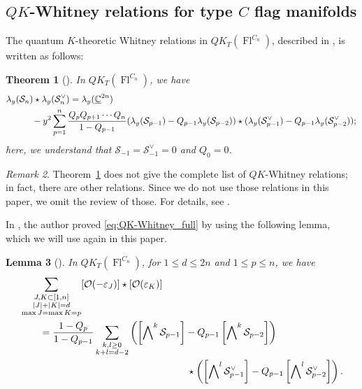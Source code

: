 \documentclass[a4paper, 11pt, reqno]{amsart}
\numberwithin{equation}{section}
\newcommand{\BC}{\mathbb{C}}
\newcommand{\udBC}{\underline{\BC}}
\newcommand{\CO}{\mathcal{O}}
\newcommand{\CS}{\mathcal{S}}
\newcommand{\ve}{\varepsilon}
\newcommand{\Fl}{\operatorname{Fl}}
\newcommand{\FlC}[1]{\operatorname{Fl}^{C_{#1}}}
\newcommand{\extprod}{\bigwedge\nolimits}
\theoremstyle{plain}
\newtheorem{thm}{Theorem}[section]
\newtheorem{lem}[thm]{Lemma}
\theoremstyle{definition}
\theoremstyle{remark}
\newtheorem{rem}[thm]{Remark}
\begin{document}
\subsection{\texorpdfstring{$QK$-Whitney relations for type $C$ flag manifolds}{QK-Whitney relations for type C}}
The quantum $K$-theoretic Whitney relations in $QK_{T}(\Fl^{C_{n}})$, described in \cite{Kouno}, is written as follows: 
\begin{thm}[{\cite[Theorem~3.2]{Kouno}}] \label{thm:QK-Whitney_full}
In $QK_{T}(\Fl^{C_{n}})$, we have 
\begin{equation} \label{eq:QK-Whitney_full}
\begin{split}
& \lambda_{y}(\CS_{n}) \star \lambda_{y}(\CS_{n}^{\vee}) = \lambda_{y}(\udBC^{2n}) \\ 
& \hspace{10mm} - y^{2} \sum_{p=1}^{n} \frac{Q_{p}Q_{p+1} \cdots Q_{n}}{1-Q_{p-1}} (\lambda_{y}(\CS_{p-1}) - Q_{p-1} \lambda_{y}(\CS_{p-2})) \star (\lambda_{y}(\CS_{p-1}^{\vee}) - Q_{p-1} \lambda_{y}(\CS_{p-2}^{\vee})); 
\end{split}
\end{equation}
here, we understand that $\CS_{-1} = \CS_{-1}^{\vee} = 0$ and $Q_{0} = 0$. 
\end{thm}

\begin{rem}
Theorem~\ref{thm:QK-Whitney_full} does not give the complete list of $QK$-Whitney relations; in fact, there are other relations. 
Since we do not use those relations in this paper, we omit the review of those. For details, see \cite[Theorem~3.1]{Kouno}. 
\end{rem}

In \cite{Kouno}, the author proved \eqref{eq:QK-Whitney_full} by using the following lemma, which we will use again in this paper. 

\begin{lem}[{\cite[Lemma~5.7]{Kouno}}] \label{lem:to_recursive}
In $QK_{T}(\FlC{n})$, for $1 \le d \le 2n$ and $1 \le p \le n$, we have
\begin{equation} \label{eq:QK-Whitney_computation_lem2}
\begin{split}
& \sum_{\substack{J, K \subset [1, n] \\ |J| + |K| = d \\ \max J = \max K = p}} [\CO(-\ve_{J})] \star [\CO(\ve_{K})] \\ 
& \qquad = \frac{1-Q_{p}}{1-Q_{p-1}} \sum_{\substack{k, l \ge 0 \\ k+l = d-2}} \left( \left[ \extprod^{k} \CS_{p-1} \right] - Q_{p-1} \left[ \extprod^{k} \CS_{p-2} \right] \right) \\ 
& \hspace{60mm} \star \left( \left[ \extprod^{l} \CS_{p-1}^{\vee} \right] - Q_{p-1} \left[ \extprod^{l} \CS_{p-2}^{\vee} \right] \right). 
\end{split}
\end{equation}
\end{lem}
\end{document}
